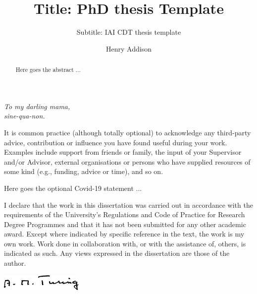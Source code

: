 \documentclass{uob-phd-thesis}
\title{Title: PhD thesis Template }
\subtitle{Subtitle: IAI CDT thesis template}
\author{Henry Addison}
\date{\printdatewithoutmonth{thesisdate}}
\begin{document}
\maketitle
\cleardoubleoddemptypage

\begin{abstract}

	Here goes the abstract ...
\end{abstract}

\begin{dedicationandacknowledgements}
	\begin{center}
    \Large\itshape {To my darling mama,\\
		sine-qua-non.}
  \end{center}


	It is common practice (although totally optional) to acknowledge any third-party
	advice, contribution or influence you have found useful during your work.
	Examples include support from friends or family, the input of your Supervisor
	and/or Advisor, external organisations or persons who  have supplied resources
	of some kind (e.g., funding, advice or time), and so on.
\end{dedicationandacknowledgements}

\begin{covid}

	Here goes the optional Covid-19 statement ...
\end{covid}

\begin{declaration}
	I declare that the work in this dissertation was carried out in accordance with the requirements of the University's Regulations and Code of Practice for Research Degree Programmes and that it has not been submitted for any other academic award. Except where indicated by specific reference in the text, the work is my own work. Work done in collaboration with, or with the assistance of, others, is indicated as such. Any views expressed in the dissertation are those of the author.
  \vspace{2cm}

  \includegraphics[width=4cm]{sig}
\end{declaration}
\end{document}
